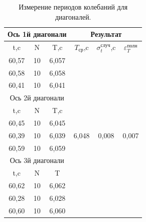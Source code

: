 \begin{table}[h!]
\centering
\begin{tabular}{|ccc|ccc|}
\hline
\multicolumn{3}{|c|}{Ось 1й диагонали}                         & \multicolumn{3}{c|}{Результат}                   \\ \hline
\multicolumn{1}{|c|}{t,c} &
  \multicolumn{1}{c|}{N} &
  T,c &
  \multicolumn{1}{c|}{$T_\text{ср}$,c} &
  \multicolumn{1}{c|}{$\sigma_t^\text{случ}$,c} &
  $\varepsilon_T^\text{полн}$ \\ \hline
\multicolumn{1}{|c|}{60,57} &
  \multicolumn{1}{c|}{10} &
  6,057 &
  \multicolumn{1}{c|}{\multirow{13}{*}{6,048}} &
  \multicolumn{1}{c|}{\multirow{13}{*}{0,008}} &
  \multirow{13}{*}{0,007} \\ \cline{1-3}
\multicolumn{1}{|c|}{60,58} & \multicolumn{1}{c|}{10} & 6,058 & \multicolumn{1}{c|}{} & \multicolumn{1}{c|}{} &  \\ \cline{1-3}
\multicolumn{1}{|c|}{60,41} & \multicolumn{1}{c|}{10} & 6,041 & \multicolumn{1}{c|}{} & \multicolumn{1}{c|}{} &  \\ \cline{1-3}
\multicolumn{3}{|c|}{Ось 2й диагонали}                         & \multicolumn{1}{c|}{} & \multicolumn{1}{c|}{} &  \\ \cline{1-3}
\multicolumn{1}{|c|}{t,c}   & \multicolumn{1}{c|}{N}  & T,c   & \multicolumn{1}{c|}{} & \multicolumn{1}{c|}{} &  \\ \cline{1-3}
\multicolumn{1}{|c|}{60,45} & \multicolumn{1}{c|}{10} & 6,045 & \multicolumn{1}{c|}{} & \multicolumn{1}{c|}{} &  \\ \cline{1-3}
\multicolumn{1}{|c|}{60,39} & \multicolumn{1}{c|}{10} & 6,039 & \multicolumn{1}{c|}{} & \multicolumn{1}{c|}{} &  \\ \cline{1-3}
\multicolumn{1}{|c|}{60,59} & \multicolumn{1}{c|}{10} & 6,059 & \multicolumn{1}{c|}{} & \multicolumn{1}{c|}{} &  \\ \cline{1-3}
\multicolumn{3}{|c|}{Ось 3й диагонали}                         & \multicolumn{1}{c|}{} & \multicolumn{1}{c|}{} &  \\ \cline{1-3}
\multicolumn{1}{|c|}{t,c}   & \multicolumn{1}{c|}{N}  & T     & \multicolumn{1}{c|}{} & \multicolumn{1}{c|}{} &  \\ \cline{1-3}
\multicolumn{1}{|c|}{60,62} & \multicolumn{1}{c|}{10} & 6,062 & \multicolumn{1}{c|}{} & \multicolumn{1}{c|}{} &  \\ \cline{1-3}
\multicolumn{1}{|c|}{60,28} & \multicolumn{1}{c|}{10} & 6,028 & \multicolumn{1}{c|}{} & \multicolumn{1}{c|}{} &  \\ \cline{1-3}
\multicolumn{1}{|c|}{60,60} & \multicolumn{1}{c|}{10} & 6,060 & \multicolumn{1}{c|}{} & \multicolumn{1}{c|}{} &  \\ \hline
\end{tabular}
\caption{Измерение периодов колебаний для диагоналей.}
\label{tabl3}
\end{table}



